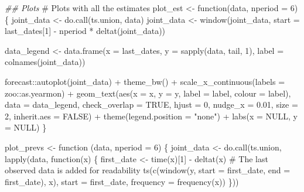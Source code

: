 \documentclass[
]{article}
\newenvironment{Shaded}{\begin{snugshade}}{\end{snugshade}}
\newcommand{\AttributeTok}[1]{\textcolor[rgb]{0.40,0.45,0.13}{#1}}
\newcommand{\CommentTok}[1]{\textcolor[rgb]{0.37,0.37,0.37}{#1}}
\newcommand{\ConstantTok}[1]{\textcolor[rgb]{0.56,0.35,0.01}{#1}}
\newcommand{\ControlFlowTok}[1]{\textcolor[rgb]{0.00,0.23,0.31}{#1}}
\newcommand{\DecValTok}[1]{\textcolor[rgb]{0.68,0.00,0.00}{#1}}
\newcommand{\DocumentationTok}[1]{\textcolor[rgb]{0.37,0.37,0.37}{\textit{#1}}}
\newcommand{\FloatTok}[1]{\textcolor[rgb]{0.68,0.00,0.00}{#1}}
\newcommand{\FunctionTok}[1]{\textcolor[rgb]{0.28,0.35,0.67}{#1}}
\newcommand{\NormalTok}[1]{\textcolor[rgb]{0.00,0.23,0.31}{#1}}
\newcommand{\OtherTok}[1]{\textcolor[rgb]{0.00,0.23,0.31}{#1}}
\newcommand{\SpecialCharTok}[1]{\textcolor[rgb]{0.37,0.37,0.37}{#1}}
\newcommand{\StringTok}[1]{\textcolor[rgb]{0.13,0.47,0.30}{#1}}
\newcommand\1{\mathds{1}}
\begin{document}
\begin{Shaded}
\begin{Highlighting}[]
\DocumentationTok{\#\# Plots}
\CommentTok{\# Plots with all the estimates}
\NormalTok{plot\_est }\OtherTok{\textless{}{-}} \ControlFlowTok{function}\NormalTok{(data, }\AttributeTok{nperiod =} \DecValTok{6}\NormalTok{) \{}
\NormalTok{  joint\_data }\OtherTok{\textless{}{-}} \FunctionTok{do.call}\NormalTok{(ts.union, data)}
\NormalTok{  joint\_data }\OtherTok{\textless{}{-}}
    \FunctionTok{window}\NormalTok{(joint\_data,}
           \AttributeTok{start =}\NormalTok{ last\_dates[}\DecValTok{1}\NormalTok{] }\SpecialCharTok{{-}}\NormalTok{ nperiod }\SpecialCharTok{*} \FunctionTok{deltat}\NormalTok{(joint\_data))}

\NormalTok{  data\_legend }\OtherTok{\textless{}{-}}
    \FunctionTok{data.frame}\NormalTok{(}\AttributeTok{x =}\NormalTok{ last\_dates,}
               \AttributeTok{y =} \FunctionTok{sapply}\NormalTok{(data, tail, }\DecValTok{1}\NormalTok{),}
               \AttributeTok{label =} \FunctionTok{colnames}\NormalTok{(joint\_data))}

\NormalTok{  forecast}\SpecialCharTok{::}\FunctionTok{autoplot}\NormalTok{(joint\_data) }\SpecialCharTok{+} \FunctionTok{theme\_bw}\NormalTok{() }\SpecialCharTok{+}
    \FunctionTok{scale\_x\_continuous}\NormalTok{(}\AttributeTok{labels =}\NormalTok{ zoo}\SpecialCharTok{::}\NormalTok{as.yearmon) }\SpecialCharTok{+}
    \FunctionTok{geom\_text}\NormalTok{(}\FunctionTok{aes}\NormalTok{(}\AttributeTok{x =}\NormalTok{ x, }\AttributeTok{y =}\NormalTok{ y, }\AttributeTok{label =}\NormalTok{ label, }\AttributeTok{colour =}\NormalTok{ label),}
              \AttributeTok{data =}\NormalTok{ data\_legend,}
              \AttributeTok{check\_overlap =} \ConstantTok{TRUE}\NormalTok{, }\AttributeTok{hjust =} \DecValTok{0}\NormalTok{, }\AttributeTok{nudge\_x =} \FloatTok{0.01}\NormalTok{,}
              \AttributeTok{size =} \DecValTok{2}\NormalTok{, }\AttributeTok{inherit.aes =} \ConstantTok{FALSE}\NormalTok{) }\SpecialCharTok{+}
    \FunctionTok{theme}\NormalTok{(}\AttributeTok{legend.position =} \StringTok{"none"}\NormalTok{)  }\SpecialCharTok{+}
    \FunctionTok{labs}\NormalTok{(}\AttributeTok{x =} \ConstantTok{NULL}\NormalTok{, }\AttributeTok{y =} \ConstantTok{NULL}\NormalTok{)}
\NormalTok{\}}

\NormalTok{plot\_prevs }\OtherTok{\textless{}{-}} \ControlFlowTok{function}\NormalTok{ (data, }\AttributeTok{nperiod =} \DecValTok{6}\NormalTok{) \{}
\NormalTok{  joint\_data }\OtherTok{\textless{}{-}} \FunctionTok{do.call}\NormalTok{(ts.union, }\FunctionTok{lapply}\NormalTok{(data, }\ControlFlowTok{function}\NormalTok{(x) \{}
\NormalTok{    first\_date }\OtherTok{\textless{}{-}} \FunctionTok{time}\NormalTok{(x)[}\DecValTok{1}\NormalTok{] }\SpecialCharTok{{-}} \FunctionTok{deltat}\NormalTok{(x)}
    \CommentTok{\# The last observed data is added for readability}
    \FunctionTok{ts}\NormalTok{(}\FunctionTok{c}\NormalTok{(}\FunctionTok{window}\NormalTok{(y, }\AttributeTok{start =}\NormalTok{ first\_date, }\AttributeTok{end =}\NormalTok{ first\_date), x),}
       \AttributeTok{start =}\NormalTok{ first\_date, }\AttributeTok{frequency =} \FunctionTok{frequency}\NormalTok{(x))}
\NormalTok{  \}))}


\end{Highlighting}
\end{Shaded}
\end{document}
